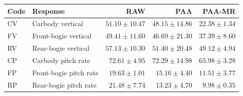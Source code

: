 \begin{tabular}{llrrr}
\toprule
Code & Response & RAW & PAA & PAA-MR \\
\midrule
CV & Carbody vertical & $51.10 \pm 10.47$ & $48.15 \pm 14.86$ & $22.38 \pm 1.34$ \\
FV & Front-bogie vertical & $49.41 \pm 11.60$ & $46.69 \pm 21.30$ & $37.39 \pm 8.60$ \\
RV & Rear-bogie vertical & $57.13 \pm 10.30$ & $51.40 \pm 20.48$ & $49.12 \pm 4.94$ \\
CP & Carbody pitch rate & $72.61 \pm 4.95$ & $72.29 \pm 14.98$ & $65.98 \pm 3.28$ \\
FP & Front-bogie pitch rate & $19.63 \pm 1.01$ & $15.16 \pm 4.40$ & $11.51 \pm 3.77$ \\
RP & Rear-bogie pitch rate & $21.48 \pm 7.74$ & $13.23 \pm 4.70$ & $9.98 \pm 0.35$ \\
\bottomrule
\end{tabular}

